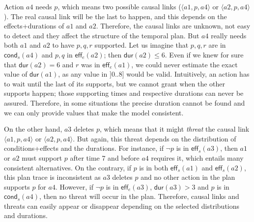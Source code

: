 \documentclass[runningheads]{llncs}
\newcommand{\tup}[1]{{\langle #1 \rangle}}
\newcommand{\eff}{\mathsf{eff}}    %
\newcommand{\cond}{\mathsf{cond}}  %
\newcommand{\dur}{\mathsf{dur}}    %
\begin{document}
Action $a4$ needs $p$, which means two possible causal links ($\tup{a1,p,a4}$ or $\tup{a2,p,a4}$). The real causal link will be the last to happen, and this depends on the effects+durations of $a1$ and $a2$. Therefore, the causal links are unknown, not easy to detect and they affect the structure of the temporal plan. But $a4$ really needs both $a1$ and $a2$ to have $p,q,r$ supported. Let us imagine that $p,q,r$ are in $\cond_s(a4)$ and $p,q$ in $\eff_e(a2)$; then $\dur(a2) \leq 6$. Even if we knew for sure that $\dur(a2)=6$ and $r$ was in $\eff_e(a1)$, we could never estimate the exact value of $\dur(a1)$, as any value in $]0..8]$ would be valid. Intuitively, an action has to wait until the last of its supports, but we cannot grant when the other supports happen; those supporting times and respective durations can never be assured. Therefore, in some situations the precise duration cannot be found and we can only provide values that make the model consistent.

On the other hand, $a3$ deletes $p$, which means that it might \emph{threat} the causal link $\tup{a1,p,a4}$ or $\tup{a2,p,a4}$. But again, this threat depends on the distribution of conditions+effects and the durations. For instance, if $\neg p$ is in $\eff_s(a3)$, then $a1$ or $a2$ must support $p$ after time 7 and before $a4$ requires it, which entails many consistent alternatives. On the contrary, if $p$ is in both $\eff_s(a1)$ and $\eff_s(a2)$, this plan trace is inconsistent as $a3$ deletes $p$ and no other action in the plan supports $p$ for $a4$. However, if $\neg p$ is in $\eff_e(a3)$, $\dur(a3) > 3$ and $p$ is in $\cond_s(a4)$, then no threat will occur in the plan. Therefore, causal links and threats can easily appear or disappear depending on the selected distributions and durations.
\end{document}
